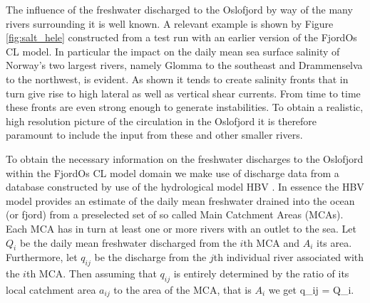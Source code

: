 The influence of the freshwater discharged to the Oslofjord by way of the many rivers surrounding it is well known. A relevant example is shown by Figure \ref{fig:salt_hele} constructed from a test run with an earlier version of the FjordOs CL model. In particular the impact on the daily mean sea surface salinity of Norway's two largest rivers, namely Glomma to the southeast and Drammenselva to the northwest, is evident. As shown it tends to create salinity fronts that in turn give rise to high lateral as well as vertical shear currents. From time to time these fronts are even strong enough to generate instabilities. To obtain a realistic, high resolution picture of the circulation in the Oslofjord it is therefore paramount to include the input from these and other smaller rivers.
%
 

To obtain the necessary information on the freshwater discharges to the Oslofjord within the FjordOs CL model domain we make use of discharge data from a database constructed by use of the hydrological model HBV \citep{beldr:etal:2003}. In essence the HBV model provides an estimate of the daily mean freshwater drained into the ocean (or fjord) from a preselected set of so called Main Catchment Areas (MCAs). Each MCA has in turn at least one or more rivers with an outlet to the sea. Let $Q_i$ be the daily mean freshwater discharged from the $i$th MCA and $A_i$ its area. Furthermore, let $q_{ij}$ be the discharge from the $j$th individual river associated with the $i$th MCA. Then assuming that $q_{ij}$ is entirely determined by the ratio of its local catchment area $a_{ij}$ to the area of the MCA, that is $A_i$ we get
\be
 \label{eq:riv02}
  q_{ij} =  Q_i.
\ee

